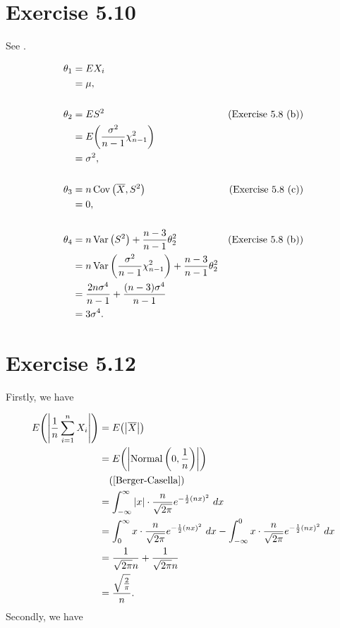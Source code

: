 \documentclass[12pt,letterpaper,reqno]{amsart}
\numberwithin{equation}{subsection}
\begin{document}
\newpage
\section{Exercise 5.10}

See \cite[Theorem 5.3.1 on page 218]{Berger-Casella}.

    
    \begin{align*}
        \theta_1 &= EX_i \\
                 &= \mu, \\
        \\
        \theta_2 &= ES^2 & \left(\mbox{Exercise 5.8 (b)} \right)\\
                 &= {E}\! \left( {\frac{\sigma^2}{n-1} \chi_{n-1}^2} \right) \\
                 &= \sigma^2, \\
        \\
        \theta_3 &= n \operatorname{Cov}\left( {\overline{{X}}, S^2} \right) & \left(\mbox{Exercise 5.8 (c)} \right)\\
        &= 0, \\
        \\
        \theta_4 &= n \operatorname{Var}\left( {S^2} \right) + \frac{n-3}{n-1}\theta_2^2 & \left(\mbox{Exercise 5.8 (b)} \right)\\
        &= n \operatorname{Var}\left( {\frac{\sigma^2}{n-1} \chi_{n-1}^2} \right) + \frac{n-3}{n-1}\theta_2^2 \\
        &= \frac{2n \sigma^4}{n-1} + \frac{(n-3)\sigma^4}{n-1} \\
        &= 3 \sigma^4.
    \end{align*}
    
    
\newpage
\section{Exercise 5.12}

Firstly, we have

\begin{align*}
    \fun{E}{\Abs{\frac{1}{n} \sum_{i=1}^n X_i}} &= \fun{E}{\Abs{\ol{X}}} \\
    &= \fun{E}{\Abs{\normaldist{0, \frac{1}{n}}}} \\
    & \hspace{0.3cm} \left( \mbox{\cite[Theorem 5.3.1 on page 218]{Berger-Casella}} \right) \\
    &= \myint{\Abs{x} \cdot \frac{n}{\sqrt{2\pi}} e^{-\frac{1}{2} \left( nx \right)^2}}{x}{-\infty}{\infty} \\
    &= \myint{x \cdot \frac{n}{\sqrt{2\pi}} e^{-\frac{1}{2} \left( nx \right)^2}}{x}{0}{\infty} - \myint{x \cdot \frac{n}{\sqrt{2\pi}} e^{-\frac{1}{2} \left( nx \right)^2}}{x}{-\infty}{0} \\
    &= \frac{1}{\sqrt{2\pi}n} + \frac{1}{\sqrt{2\pi}n} \\
    &= \frac{\sqrt{\frac{2}{\pi}}}{n}.
\end{align*}
Secondly, we have
\end{document}
